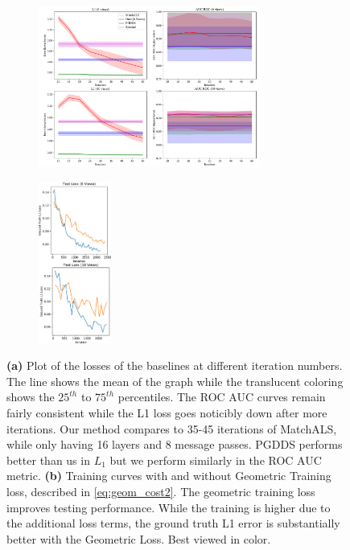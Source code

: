 \documentclass{article} %
\begin{document}
\begin{figure}[t]
\centering
\begin{subfigure}[b]{.70\textwidth}
  \centering
  \includegraphics[height=200px]{figures-error_lines.pdf}
  \caption{}
  \label{fig:3a}
  \label{fig:errorlines}
\end{subfigure}
\begin{subfigure}[b]{.25\textwidth}
  \centering
  \includegraphics[height=200px]{figures-GeometricLoss.pdf}
  \caption{}
  \label{fig:3b}
  \label{fig:geomloss}
\end{subfigure}
\caption{
  \textbf{(a)} Plot of the losses of the baselines at different iteration numbers.
  The line shows the mean of the graph while the translucent coloring shows the $25^{th}$ to $75^{th}$ percentiles.
  The ROC AUC curves remain fairly consistent while the L1 loss goes noticibly down after more iterations.
  Our method compares to 35-45 iterations of MatchALS, while only having 16 layers and 8 message passes.
  PGDDS performs better than us in $L_1$ but we perform similarly in the ROC AUC metric.
  \textbf{(b)} Training curves with and without Geometric Training loss, described in \ref{eq:geom_cost2}.
  The geometric training loss improves testing performance.
  While the training is higher due to the additional loss terms, the ground truth L1 error is substantially better with the Geometric Loss.
  Best viewed in color.
}
\label{fig:3}
\end{figure}
\end{document}
